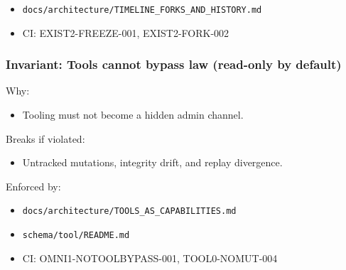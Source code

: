 \documentclass[9pt,a4paper,openany]{book}
\begin{document}
\begin{itemize}
\item \texttt{docs/\allowbreak{}architecture/\allowbreak{}TIMELINE\_\allowbreak{}FORKS\_\allowbreak{}AND\_\allowbreak{}HISTORY.\allowbreak{}md}
\end{itemize}


\begin{itemize}
\item CI: EXIST2-\allowbreak{}FREEZE-\allowbreak{}001, EXIST2-\allowbreak{}FORK-\allowbreak{}002
\end{itemize}





\subsubsection{Invariant: Tools cannot bypass law (read-only by default)}


Why:



\begin{itemize}
\item Tooling must not become a hidden admin channel.\allowbreak{}
\end{itemize}


Breaks if violated:



\begin{itemize}
\item Untracked mutations, integrity drift, and replay divergence.\allowbreak{}
\end{itemize}


Enforced by:



\begin{itemize}
\item \texttt{docs/\allowbreak{}architecture/\allowbreak{}TOOLS\_\allowbreak{}AS\_\allowbreak{}CAPABILITIES.\allowbreak{}md}
\end{itemize}


\begin{itemize}
\item \texttt{schema/\allowbreak{}tool/\allowbreak{}README.\allowbreak{}md}
\end{itemize}


\begin{itemize}
\item CI: OMNI1-\allowbreak{}NOTOOLBYPASS-\allowbreak{}001, TOOL0-\allowbreak{}NOMUT-\allowbreak{}004
\end{itemize}
\end{document}
